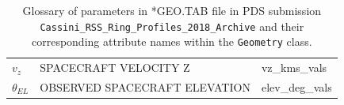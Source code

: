 \documentclass[titlepage, 12pt]{article}
\begin{document}
\begin{table}[H]
\begin{tabular}{l l l}
                    $v_z$&SPACECRAFT VELOCITY Z
                         &vz\_kms\_vals\\
                    $\theta_{EL}$&OBSERVED SPACECRAFT ELEVATION
                                 &elev\_deg\_vals \\ 
                    \hline
                \end{tabular}
                \caption[Glossary of parameters in the *GEO.TAB file]
                    {Glossary of parameters in *GEO.TAB file
                     in PDS submission
                     \texttt{Cassini\_RSS\_Ring\_Profiles\_2018\_Archive}
                     and their corresponding attribute names
                     within the \texttt{Geometry} class.}
                \label{tab:easydata_glossary_of_geo_file}
            \end{table}
 
\end{document}
